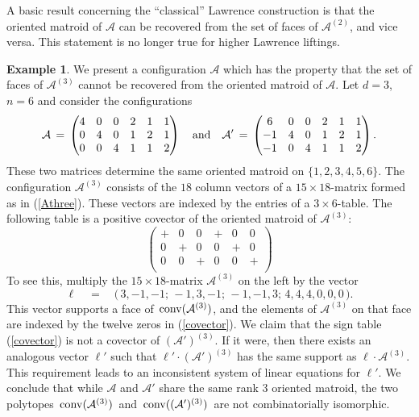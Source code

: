 \documentclass[11pt]{amsart}
\theoremstyle{definition}
\newtheorem{example}[theorem]{Example}
\newcommand{\A}{{\mathcal A}}
\begin{document}
A basic result concerning the ``classical'' Lawrence
construction is that the oriented matroid of $\A$
can be recovered from the set of faces of $\A^{(2)}$,
and vice versa. This statement is
no longer true for higher Lawrence liftings.


\begin{example}
   \label{exm.mother}
We present a configuration $\A$ which has the property that
the set of faces of $\A^{(3)}$ cannot be recovered
from the oriented matroid of $\A$.
  Let  $d = 3$, $n = 6$ and consider the configurations
  \begin{equation}
  \A \, =\,
  \begin{pmatrix}
  4 & 0 & 0& 2& 1 & 1 \\
  0 & 4 & 0& 1& 2 & 1 \\
  0 & 0 & 4& 1& 1 & 2 \\
  \end{pmatrix} \quad \hbox{and}
\quad \A' \, =\,
  \begin{pmatrix}
  6 & 0 & 0& 2& 1 & 1 \\
  -1 & 4 & 0& 1& 2 & 1 \\
  -1 & 0 & 4& 1& 1 & 2 \\
\end{pmatrix}.
  \end{equation}
These two matrices determine the same
oriented matroid on $\{1,2,3,4,5,6\}$.
The configuration $\A^{(3)}$ consists of the $18$
column vectors of a $15 \times 18$-matrix formed as in (\ref{Athree}).
These vectors are indexed by the entries of a $3 \times 6$-table.
The following table is a positive covector of
the oriented matroid of $\A^{(3)}$:
\begin{equation}
\label{covector}
\begin{pmatrix}
+ & 0 & 0 & + & 0 & 0 \\
0 & + & 0 & 0 & + & 0 \\
0 & 0 & + & 0 & 0 & + \\
\end{pmatrix}
\end{equation}
To see this, multiply the $15 \times 18$-matrix $\A^{(3)}$
on the left by the vector
$$
\ell \quad = \quad
  \bigl(\, 3, -1, -1;\, -1, 3, -1;\, -1, -1, 3;\, 4,4,4,0,0,0 \,\bigr).
$$
This vector supports a face of $\,{\rm conv}(\A^{(3)})$,
and the elements of  $\A^{(3)}$ on that face
are indexed by the twelve zeros in (\ref{covector}).
We claim that the sign table (\ref{covector})
is not a covector of $(\A')^{(3)}$. If it were,
then there exists an analogous vector $\ell'$
such that $\ell' \cdot (\A')^{(3)}$ has
the same support as $\ell \cdot \A^{(3)}$.
This requirement leads to an inconsistent system
of linear equations for $\ell'$.
We conclude that while $\A$ and $\A'$
share the same rank $3$ oriented matroid, the
two polytopes $\, {\rm conv}(\A^{(3)}) \,$
and  $\, {\rm conv}( (\A')^{(3)}) \,$
are not combinatorially isomorphic.
  \end{example}
\end{document}
